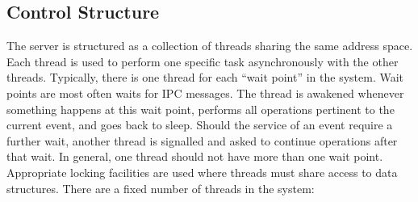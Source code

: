 \subsection{Control Structure}
The server is structured as a collection of threads sharing the same address
space.  Each thread is used to perform one specific task asynchronously with
the other threads.  Typically, there is one thread for each ``wait point''
in the system.  Wait points are most often waits for IPC messages.  The
thread is awakened whenever something happens at this wait point, performs
all operations pertinent to the current event, and goes back to sleep.
Should the service of an event require a further wait, another thread is
signalled and asked to continue operations after that wait.  In general, one
thread should not have more than one wait point.  Appropriate locking
facilities are used where threads must share access to data structures.
There are a fixed number of threads in the system:
